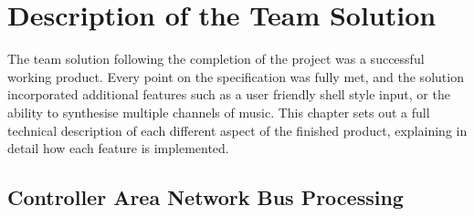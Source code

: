 \section{Description of the Team Solution}

The team solution following the completion of the project was a successful 
working product. Every point on the specification was fully met, and the solution 
incorporated additional features such as a user friendly shell style input, or 
the ability to synthesise multiple channels of music. This chapter sets out a 
full technical description of each different aspect of the finished product, 
explaining in detail how each feature is implemented. 

\subsection*{Controller Area Network Bus Processing}

